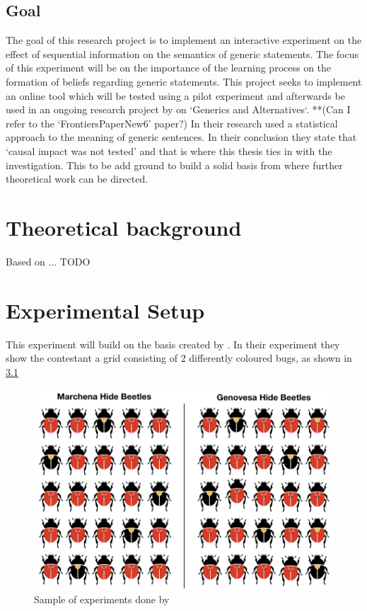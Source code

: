 \documentclass[twoside]{uva-inf-bachelor-thesis}
\begin{document}
\section{Goal}
The goal of this research project is to implement an interactive experiment on the effect of sequential information on the semantics of generic statements. The focus of this experiment will be on the importance of the learning process on the formation of beliefs regarding generic statements. This project seeks to implement an online tool which will be tested using a pilot experiment and afterwards be used in an ongoing research project by \cite{RooijSchulzGenAlt} on `Generics and Alternatives`. **(Can I refer to the `FrontiersPaperNew6' paper?) In their research \cite{RooijSchulzGenAlt} used a statistical approach to the meaning of generic sentences. In their conclusion they state that `causal impact was not tested' and that is where this thesis ties in with the investigation. This to be add ground to build a solid basis from where further theoretical work can be directed.



\chapter{Theoretical background}
Based on ... TODO



\chapter{Experimental Setup}
This experiment will build on the basis created by \cite{RooijSchulzGenAlt}. In their experiment they show the contestant a grid consisting of 2 differently coloured bugs, as shown in \ref{fig:beetle_example}
\begin{figure}
    \centering
    \includegraphics[width=\textwidth]{Project/Thesis/LaTeX/images/beetles_example.png}
    \caption{Sample of experiments done by \cite{RooijSchulzGenAlt}}
    \label{fig:beetle_example}
\end{figure}
\end{document}

